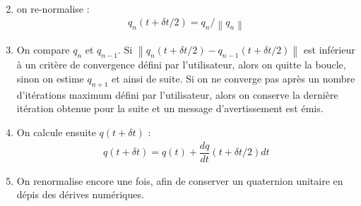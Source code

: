 \documentclass[12pt]{article}
\begin{document}
\begin{enumerate}
\begin{eqnarray}
\end{eqnarray}
\item on re-normalise :
\begin{eqnarray}
q_n\left(t+\delta t/2\right)=q_n/ \left\|q_n\right\|
\end{eqnarray}
\item On compare $q_n$ et $q_{n-1}$. Si $\left\|q_n\left(t+\delta t/2\right)-q_{n-1}\left(t+\delta t/2\right)\right\|$ est inférieur à un critère de convergence défini par l'utilisateur, alors on quitte la boucle, sinon on estime $q_{n+1}$ et ainsi de suite. Si on ne converge pas après un nombre d'itérations maximum défini par l'utilisateur, alors on conserve la dernière itération obtenue pour la suite et un message d'avertissement est émis.
\item On calcule ensuite $q\left(t+\delta t\right)$ :
\begin{eqnarray}
q\left(t+\delta t\right)=q\left(t\right)+\dfrac{dq}{dt}\left(t+\delta t/2\right) dt
\end{eqnarray}
\item On renormalise encore une fois, afin de conserver un quaternion unitaire en dépis des dérives numériques.
\end{enumerate}




\end{document}
